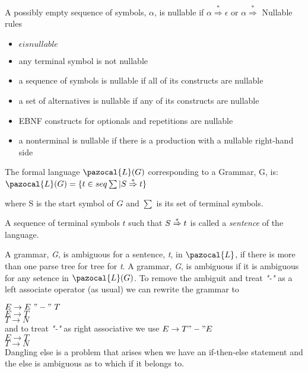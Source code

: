 A possibly empty sequence of symbols, $\alpha$, is nullable if  $\alpha \stackrel{*}{\Rightarrow} \epsilon$ or $\alpha \stackrel{*}{\Rightarrow}$
Nullable rules
\begin{itemize}
        \item $\epsilon is nullable$
        \item any terminal symbol is not nullable
        \item a sequence of symbols is nullable if all of its constructs are nullable
        \item a set of alternatives is nullable if any of its constructs are nullable
        \item EBNF constructs for optionals and repetitions are nullable
        \item a nonterminal is nullable if there is a production with a nullable right-hand side
\end{itemize}

The formal language $\pazocal{L}(G)$ corresponding to a Grammar, G, is:
$\pazocal{L}(G) = \{t \in seq \sum | S \stararrow t \}$

where S is the start symbol of $G$ and $\sum$ is its set of terminal symbols.

A sequence of terminal symbols $t$ such that $S \stackrel{*}{\Rightarrow} t$ is called a \emph{sentence} of the language.

A grammar, \emph{G}, is ambiguous for a sentence, \emph{t}, in $\pazocal{L}$, if there is more than one parse tree for tree for \emph{t}.
A grammar, \emph{G}, is ambiguous if it is ambiguous for any setence in $\pazocal{L}(G)$.
To remove the ambiguit and treat \emph{"-"} as  a left associate operator (as usual) we can rewrite the grammar to

$E \rightarrow E \ "-" \ T$ \\
$E \rightarrow T$ \\
$T \rightarrow N$ \\
and to treat \emph{"-"} as right associative we use
$E \rightarrow T "-" E$ \\
$E \rightarrow T$ \\
$T \rightarrow N$ \\

Dangling else is a problem that arises when we have an if-then-else statement and the else is ambiguous as to which if it belongs to.